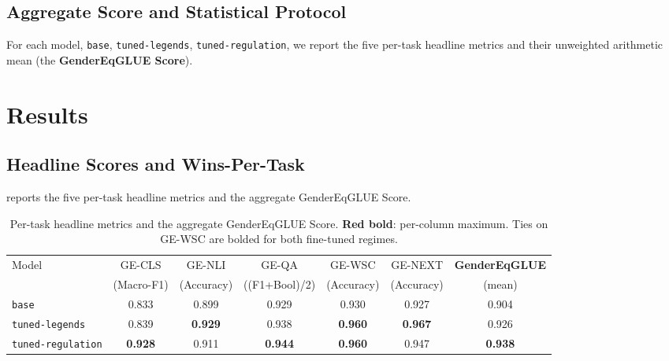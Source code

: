 \documentclass[pdflatex, sn-apa]{sn-jnl}%
\theoremstyle{thmstyleone}%
\theoremstyle{thmstyletwo}%
\theoremstyle{thmstylethree}%
\newcommand{\best}[1]{\textcolor{bestred}{\textbf{#1}}}
\newcommand{\modelbase}{\texttt{base}}
\newcommand{\modellegends}{\texttt{tuned-legends}}
\newcommand{\modelreg}{\texttt{tuned-regulation}}
\begin{document}
\subsection{Aggregate Score and Statistical Protocol}
\label{sec:bench:protocol}

For each model, \modelbase, \modellegends, \modelreg{}, we report the five
per-task headline metrics and their unweighted arithmetic mean (the
\textbf{GenderEqGLUE Score}).

\FloatBarrier

\section{Results}
\label{sec:results}

\subsection{Headline Scores and Wins-Per-Task}
\label{sec:results:headline}

 reports the five per-task headline metrics and the aggregate
GenderEqGLUE Score.

\begin{table}[h]
\centering
\caption{Per-task headline metrics and the aggregate GenderEqGLUE Score.
\best{Red bold}: per-column maximum. Ties on GE-WSC are bolded for both
fine-tuned regimes.}
\label{tab:headline}
\small
\begin{tabular}{@{}lcccccc@{}}
\toprule
Model            & GE-CLS         & GE-NLI         & GE-QA          & GE-WSC
& GE-NEXT        & \textbf{GenderEqGLUE} \\
                 & (Macro-F1)     & (Accuracy)     & ((F1+Bool)/2)  & (Accuracy)
                 & (Accuracy)     & (mean)                \\
\midrule
\modelbase       & 0.833          & 0.899          & 0.929          & 0.930
& 0.927          & 0.904                 \\
\modellegends    & 0.839          & \best{0.929}   & 0.938          &
\best{0.960}   & \best{0.967}   & 0.926                 \\
\modelreg        & \best{0.928}   & 0.911          & \best{0.944}   &
\best{0.960}   & 0.947          & \best{0.938}          \\
\bottomrule
\end{tabular}
\end{table}
\end{document}

